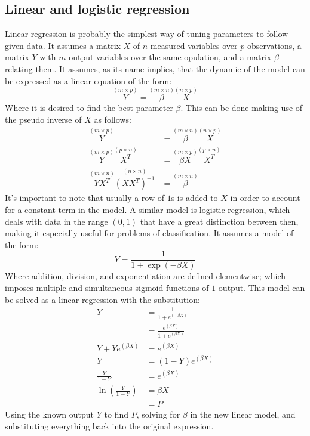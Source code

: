 \documentclass[journal]{IEEEtran}
\begin{document}
\subsection{Linear and logistic regression\label{sec:regression}}

Linear regression is probably the simplest way of tuning parameters to follow
given data. It assumes a matrix $X$ of $n$ measured variables over $p$
observations, a matrix $Y$ with $m$ output variables over the same opulation,
and a matrix $\beta$ relating them. It assumes, as its name implies, that the
dynamic of the model can be expressed as a linear equation of the form: 
%
\begin{equation}\label{eq:linear}
    \overset{(m\times p)}{Y}
    = \overset{(m\times n)}{\beta} \overset{(n\times p)}{X}
\end{equation}
%
Where it is desired to find the best parameter $\beta$. This can be done making
use of the pseudo inverse of $X$ as follows:
%
\begin{align*}
    \overset{(m\times p)}{Y}
        &= \overset{(m\times n)}{\beta} \overset{(n\times p)}{X}\\
    \overset{(m\times p)}{Y}\overset{(p\times n)}{X^T}
        &= \overset{(m\times p)}{\beta X} \overset{(p\times n)}{X^T}\nonumber\\
    \overset{(m\times n)}{Y X^T} \overset{(n\times n)}{\left(X X^T\right)^{-1}}
        &= \overset{(m\times n)}{\beta}
\end{align*}
%
It's important to note that usually a row of $1$s is added to $X$ in order to
account for a constant term in the model. A similar model is logistic
regression, which deals with data in the range $(0, 1)$ that have a great
distinction between then, making it especially useful for problems of
classification. It assumes a model of the form:
%
\begin{equation}
    Y = \frac{1}{1+\exp{(-\beta X)}}
\end{equation}
%
Where addition, division, and exponentiation are defined elementwise; which
imposes multiple and simultaneous sigmoid functions of $1$ output. 
This model can be solved as a linear regression with the substitution:
%
\begin{align*}
    Y &= \frac{1}{1+e^{(-\beta X)}}\nonumber\\
        &= \frac{e^{(\beta X)}}{1+e^{(\beta X)}}\\
    Y+Ye^{(\beta X)}
        &= e^{(\beta X)}\\
    Y &= (1-Y) e^{(\beta X)}\\
    \frac{Y}{1-Y} &= e^{(\beta X)}\\
    \ln{\left(\frac{Y}{1-Y}\right)} &= \beta X\\
        &= P
\end{align*}
%
Using the known output $Y$ to find $P$, solving for $\beta$ in the new linear
model, and substituting everything back into the original expression.
\end{document}

